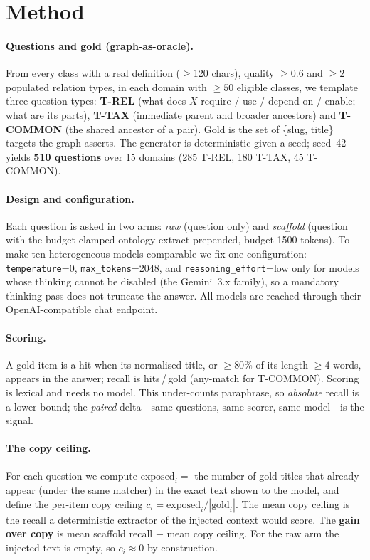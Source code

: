 \documentclass[11pt]{article}
\begin{document}
\section{Method}\label{sec:method}
\paragraph{Questions and gold (graph-as-oracle).}
From every class with a real definition ($\geq$120 chars), quality $\geq 0.6$ and $\geq 2$
populated relation types, in each domain with $\geq 50$ eligible classes, we template three
question types: \textbf{T-REL} (what does $X$ require / use / depend on / enable; what are its
parts), \textbf{T-TAX} (immediate parent and broader ancestors) and \textbf{T-COMMON} (the shared
ancestor of a pair). Gold is the set of \{slug, title\} targets the graph asserts. The generator
is deterministic given a seed; seed~42 yields \textbf{510 questions} over 15 domains (285 T-REL,
180 T-TAX, 45 T-COMMON).

\paragraph{Design and configuration.}
Each question is asked in two arms: \emph{raw} (question only) and \emph{scaffold} (question with
the budget-clamped ontology extract prepended, budget 1500 tokens). To make ten heterogeneous
models comparable we fix one configuration: \texttt{temperature}=0, \texttt{max\_tokens}=2048,
and \texttt{reasoning\_effort}=low only for models whose thinking cannot be disabled (the
Gemini~3.x family), so a mandatory thinking pass does not truncate the answer. All models are
reached through their OpenAI-compatible chat endpoint.

\paragraph{Scoring.}
A gold item is a hit when its normalised title, or $\geq 80\%$ of its length-$\geq 4$ words,
appears in the answer; recall is hits\,/\,gold (any-match for T-COMMON). Scoring is lexical and
needs no model. This under-counts paraphrase, so \emph{absolute} recall is a lower bound; the
\emph{paired} delta---same questions, same scorer, same model---is the signal.

\paragraph{The copy ceiling.}
For each question we compute $\mathrm{exposed}_i = $ the number of gold titles that already appear
(under the same matcher) in the exact text shown to the model, and define the per-item copy
ceiling $c_i = \mathrm{exposed}_i / |\text{gold}_i|$. The mean copy ceiling is the recall a
deterministic extractor of the injected context would score. The \textbf{gain over copy} is
mean scaffold recall $-$ mean copy ceiling. For the raw arm the injected text is empty, so
$c_i\approx 0$ by construction.
\end{document}

